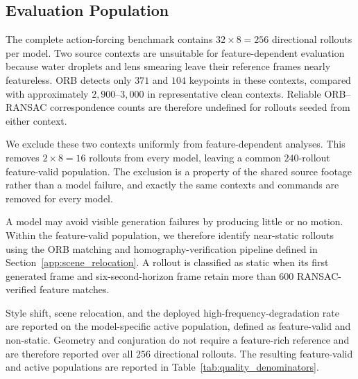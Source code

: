 \documentclass[letterpaper]{article} %
\begin{document}
\subsection{Evaluation Population}
\label{app:quality_population}

The complete action-forcing benchmark contains $32\times8=256$ directional
rollouts per model. Two source contexts are unsuitable for feature-dependent
evaluation because water droplets and lens smearing leave their reference
frames nearly featureless. ORB detects only $371$ and $104$ keypoints in these
contexts, compared with approximately $2{,}900$--$3{,}000$ in representative
clean contexts. Reliable ORB--RANSAC correspondence counts are therefore
undefined for rollouts seeded from either context.

We exclude these two contexts uniformly from feature-dependent analyses. This
removes $2\times8=16$ rollouts from every model, leaving a common
$240$-rollout feature-valid population. The exclusion is a property of the
shared source footage rather than a model failure, and exactly the same
contexts and commands are removed for every model.

A model may avoid visible generation failures by producing little or no
motion. Within the feature-valid population, we therefore identify
near-static rollouts using the ORB matching and homography-verification
pipeline defined in Section~\ref{app:scene_relocation}. A rollout is classified
as static when its first generated frame and six-second-horizon frame retain
more than $600$ RANSAC-verified feature matches.

Style shift, scene relocation, and the deployed high-frequency-degradation
rate are reported on the model-specific active population, defined as
feature-valid and non-static. Geometry and conjuration do not require a
feature-rich reference and are therefore reported over all $256$ directional
rollouts. The resulting feature-valid and active populations are reported in
Table~\ref{tab:quality_denominators}.
\end{document}
